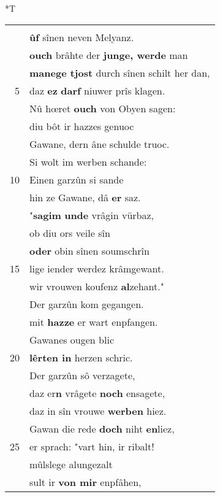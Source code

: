 \documentclass[8pt,a4paper,notitlepage]{article}
\begin{document}
\begin{table}[ht]
\begin{minipage}[t]{0.5\linewidth}
\end{minipage}
\hspace{0.5cm}
\begin{minipage}[t]{0.5\linewidth}
\small
\begin{center}*T
\end{center}
\begin{tabular}{rl}
 & \textbf{\begin{large}P\end{large}oydekuniunzes zorn} \textbf{wart} ganz\\ 
 & \textbf{ûf} sînen neven Melyanz.\\ 
 & \textbf{ouch} brâhte der \textbf{junge, werde} man\\ 
 & \textbf{manege tjost} durch sînen schilt her dan,\\ 
5 & daz \textbf{ez} \textbf{darf} niuwer prîs  klagen.\\ 
 & Nû hœret \textbf{ouch} von Obyen sagen:\\ 
 & diu bôt ir hazzes genuoc\\ 
 & Gawane, dern âne schulde truoc.\\ 
 & Si wolt im werben schande:\\ 
10 & Einen garzûn si sande\\ 
 & hin ze Gawane, dâ \textbf{er} saz.\\ 
 & "\textbf{sagim} \textbf{unde} vrâgin vürbaz,\\ 
 & ob diu ors veile sîn\\ 
 & \textbf{oder} obin sînen soumschrîn\\ 
15 & lige iender werdez krâmgewant.\\ 
 & wir vrouwen koufenz \textbf{al}zehant."\\ 
 & Der garzûn kom gegangen.\\ 
 & mit \textbf{hazze} er wart enpfangen.\\ 
 & Gawanes ougen blic\\ 
20 & \textbf{lêrten in} herzen schric.\\ 
 & Der garzûn sô verzagete,\\ 
 & daz er\textbf{n} vrâgete \textbf{noch} ensagete,\\ 
 & daz in sîn vrouwe \textbf{werben} hiez.\\ 
 & Gawan die rede \textbf{doch} niht \textbf{en}liez,\\ 
25 & er sprach: "vart hin, ir ribalt!\\ 
 & mûlslege alungezalt\\ 
 & sult ir \textbf{von mir} enpfâhen,\\ 

\end{tabular}
\end{minipage}
\end{table}
\end{document}
